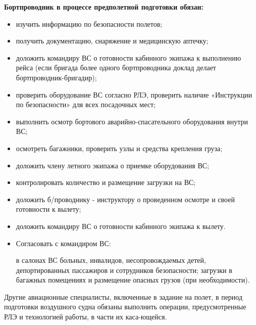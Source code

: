 \textbf{Бортпроводник в процессе предполетной подготовки обязан:}
\begin{itemize}
    \item	изучить информацию по безопасности полетов;
    \item	получить документацию, снаряжение и медицинскую аптечку;
    \item	доложить командиру ВС о готовности кабинного экипажа к выполнению рейса (если бригада более одного бортпроводника доклад делает бортпроводник-бригадир); 
    \item	проверить оборудование ВС согласно РЛЭ, проверить наличие «Инструкции по безопасности» для всех посадочных мест;
    \item	выполнить осмотр бортового аварийно-спасательного оборудования внутри ВС;
    \item	осмотреть багажники, проверить узлы и средства крепления груза;
    \item	доложить члену летного экипажа о приемке оборудования ВС; 
    \item	контролировать количество и размещение загрузки на ВС;
    \item	доложить б/проводнику - инструктору о проведенном осмотре и своей готовности к вылету;
    \item	доложить командиру ВС о готовности кабинного экипажа к вылету.
    \item Согласовать с командиром ВС:
    \begin{itemize}  
         в салонах ВС больных, инвалидов, несопровождаемых детей, депортированных пассажиров и сотрудников безопасности; 
         загрузки в багажных помещениях и размещение опасных грузов (при необходимости).
    \end{itemize}
\end{itemize}

Другие авиационные специалисты, включенные в задание на полет, в период подготовки воздушного судна обязаны выполнить операции, предусмотренные РЛЭ и технологией работы, в части их каса-ющейся.

